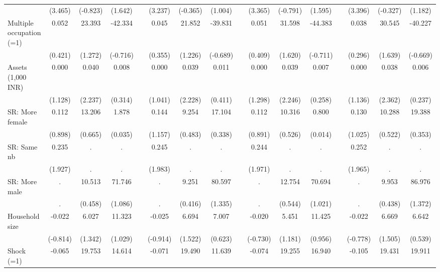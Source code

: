 {\begin{longtable}{@{\extracolsep{\fill}}lccccccccccccccc}
          & (3.465) & (-0.823) & (1.642) &       & (3.237) & (-0.365) & (1.004) &       & (3.365) & (-0.791) & (1.595) &       & (3.396) & (-0.327) & (1.182) \\
    Multiple occupation (=1) & 0.052 & 23.393 & -42.334 &       & 0.045 & 21.852 & -39.831 &       & 0.051 & 31.598 & -44.383 &       & 0.038 & 30.545 & -40.227 \\
          & (0.421) & (1.272) & (-0.716) &       & (0.355) & (1.226) & (-0.689) &       & (0.409) & (1.620) & (-0.711) &       & (0.296) & (1.639) & (-0.669) \\
    Assets (1,000 INR) & 0.000 & 0.040 & 0.008 &       & 0.000 & 0.039 & 0.011 &       & 0.000 & 0.039 & 0.007 &       & 0.000 & 0.038 & 0.006 \\
          & (1.128) & (2.237) & (0.314) &       & (1.041) & (2.228) & (0.411) &       & (1.298) & (2.246) & (0.258) &       & (1.136) & (2.362) & (0.237) \\
    SR: More female & 0.112 & 13.206 & 1.878 &       & 0.144 & 9.254 & 17.104 &       & 0.112 & 10.316 & 0.800 &       & 0.130 & 10.288 & 19.388 \\
          & (0.898) & (0.665) & (0.035) &       & (1.157) & (0.483) & (0.338) &       & (0.891) & (0.526) & (0.014) &       & (1.025) & (0.522) & (0.353) \\
    SR: Same nb & 0.235 & .     & .     &       & 0.245 & .     & .     &       & 0.244 & .     & .     &       & 0.252 & .     & . \\
          & (1.927) & .     & .     &       & (1.983) & .     & .     &       & (1.971) & .     & .     &       & (1.965) & .     & . \\
    SR: More male & .     & 10.513 & 71.746 &       & .     & 9.251 & 80.597 &       & .     & 12.754 & 70.694 &       & .     & 9.953 & 86.976 \\
          & .     & (0.458) & (1.086) &       & .     & (0.416) & (1.335) &       & .     & (0.544) & (1.021) &       & .     & (0.438) & (1.372) \\
    Household size & -0.022 & 6.027 & 11.323 &       & -0.025 & 6.694 & 7.007 &       & -0.020 & 5.451 & 11.425 &       & -0.022 & 6.669 & 6.642 \\
          & (-0.814) & (1.342) & (1.029) &       & (-0.914) & (1.522) & (0.623) &       & (-0.730) & (1.181) & (0.956) &       & (-0.778) & (1.505) & (0.539) \\
    Shock (=1) & -0.065 & 19.753 & 14.614 &       & -0.071 & 19.490 & 11.639 &       & -0.074 & 19.255 & 16.940 &       & -0.105 & 19.431 & 19.911 \\

\end{longtable}}
